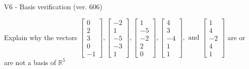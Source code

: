 \begin{exercise}
  \begin{exerciseTitle}V6 - Basis verification (ver. 606)\end{exerciseTitle}
  \begin{exerciseStatement}
    Explain why the vectors \(\left[\begin{array}{r}
0 \\
2 \\
3 \\
0 \\
-1
\end{array}\right] , \left[\begin{array}{r}
-2 \\
1 \\
-5 \\
-3 \\
1
\end{array}\right] , \left[\begin{array}{r}
1 \\
-5 \\
-2 \\
2 \\
0
\end{array}\right] , \left[\begin{array}{r}
4 \\
3 \\
-4 \\
1 \\
1
\end{array}\right] , \text{ and } \left[\begin{array}{r}
1 \\
4 \\
-2 \\
4 \\
1
\end{array}\right]\) are or are not a basis of \(\mathbb{R}^5\)	



\end{exerciseStatement}
\end{exercise}
